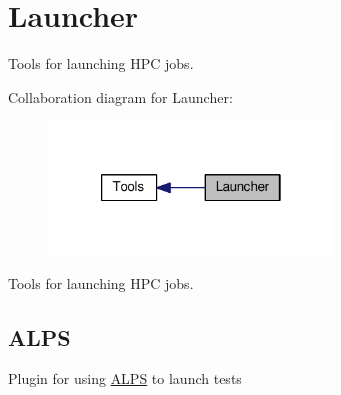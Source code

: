 \hypertarget{group__Launcher}{\section{Launcher}
\label{group__Launcher}
}


Tools for launching H\-P\-C jobs.  


Collaboration diagram for Launcher\-:
\nopagebreak
\begin{figure}[H]
\begin{center}
\leavevmode
\includegraphics[width=214pt]{group__Launcher}
\end{center}
\end{figure}
Tools for launching H\-P\-C jobs. \hypertarget{group__Launcher_ALPS}{}\subsection{A\-L\-P\-S}\label{group__Launcher_ALPS}
Plugin for using \hyperlink{namespaceALPS}{A\-L\-P\-S} to launch tests 
